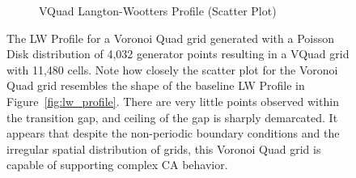 \documentclass[a4paper,11pt]{article}
\begin{document}
\begin{figure}[htp]
\begin{subfigure}[t]{0.65\textwidth}
  \caption{VQuad Langton-Wootters Profile (Scatter Plot)}
  \label{fig:vor_lw_scatter}
\end{subfigure}
\caption[Voronoi Quad Langton-Wootters Profile]{
  The LW Profile for a Voronoi Quad grid generated with a Poisson Disk distribution of 4,032 generator points resulting in a VQuad grid with 11,480 cells. Note how closely the scatter plot for the Voronoi Quad grid resembles the shape of the baseline LW Profile in Figure~\ref{fig:lw_profile}. There are very little points observed within the transition gap, and ceiling of the gap is sharply demarcated. It appears that despite the non-periodic boundary conditions and the irregular spatial distribution of grids, this Voronoi Quad grid is capable of supporting complex CA behavior.
}
\label{fig:vor_lw_profile}
\end{figure}
\end{document}
